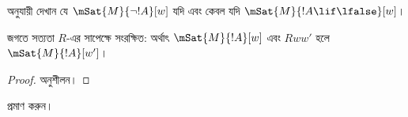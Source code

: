 \documentclass[../../../include/open-logic-section]{subfiles}
\begin{document}
\begin{prob}
   অনুযায়ী দেখান যে
  $\mSat{M}{\lnot !A}[w]$ যদি এবং কেবল যদি
  $\mSat{M}{!A \lif \lfalse}[w]$।
\end{prob}

\begin{prop}
  জগতে সত্যতা $R$-এর সাপেক্ষে সংরক্ষিত: অর্থাৎ
  $\mSat{M}{!A}[w]$ এবং $Rww'$ হলে $\mSat{M}{!A}[w']$।
\end{prop}

\begin{proof}
  অনুশীলন।
\end{proof}

\begin{prob}
   প্রমাণ করুন।
\end{prob}
\end{document}
